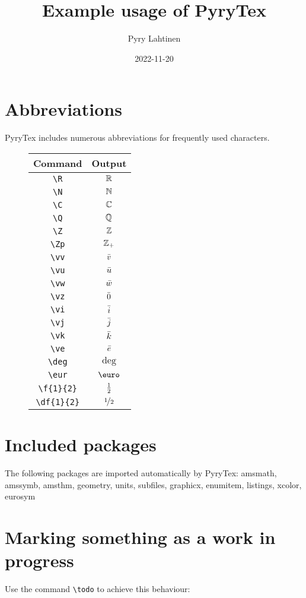 \documentclass[11pt,a4paper]{article}
\title{Example usage of PyryTex}
\author{Pyry Lahtinen}
\date{2022-11-20}
\begin{document}
\maketitle

\section{Abbreviations}
PyryTex includes numerous abbreviations for frequently used characters.

\begin{figure}[h]
    \centering\begin{tabular}{c|c}
        Command & Output \\
        \hline
        \verb!\R! & $\mathbb R$ \\
        \verb!\N! & $\mathbb N$ \\
        \verb!\C! & $\mathbb C$ \\
        \verb!\Q! & $\mathbb Q$ \\
        \verb!\Z! & $\mathbb Z$ \\
        \verb!\Zp! & $\mathbb Z_+$ \\
        \verb!\vv! & $\bar v$ \\
        \verb!\vu! & $\bar u$ \\
        \verb!\vw! & $\bar w$ \\
        \verb!\vz! & $\bar 0$ \\
        \verb!\vi! & $\bar i$ \\
        \verb!\vj! & $\bar j$ \\
        \verb!\vk! & $\bar k$ \\
        \verb!\ve! & $\bar e$ \\
        \verb!\deg! & $\deg$ \\
        \verb!\eur! & $\eur$ \\
        \verb!\f{1}{2}! & $\frac{1}{2}$ \\
        \verb!\df{1}{2}! & $\nicefrac{1}{2}$
    \end{tabular}
\end{figure}

\section{Included packages}
The following packages are imported automatically by PyryTex:
amsmath, amssymb, amsthm, geometry, units, subfiles, graphicx, enumitem, listings, xcolor, eurosym

\section{Marking something as a work in progress}
Use the command \verb!\todo! to achieve this behaviour:
\end{document}
